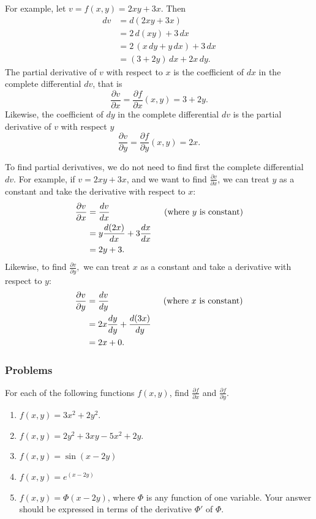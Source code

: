\documentclass[polutonikogreek,english,twoside,openright]{article}
\begin{document}
For example, let $v = f(x,y)= 2xy + 3x.$  Then 
\begin{align*}
dv & = d(2xy + 3x)\\
& = 2\,d(xy) + 3\,dx\\
& = 2\,(x\,dy + y\,dx) + 3\,dx\\
& = (3 + 2y)\,dx + 2x\,dy.
\end{align*}
The partial derivative of $v$ with respect to $x$ is the coefficient
of $dx$ in the complete differential $dv$, that is
$$ \frac{\partial v}{\partial x}= \frac{\partial f}{\partial x} (x,y) = 3+2y.$$
Likewise, the coefficient of $dy$ in the complete differential $dv$ is
the partial derivative of $v$ with respect $y$
$$  \frac{\partial v}{\partial y} = \frac{\partial f}{\partial y} (x,y) = 2x.$$

To find partial derivatives, we do not need to find first the complete
differential $dv$.  For example, if $v= 2xy + 3x$, and we want to find
$\displaystyle \frac{\partial v}{\partial x}$, we can treat $y$ as a
constant and take the derivative with respect to $x$:
\begin{align*}
  \frac{\partial v}{\partial x}  & = \frac{dv}{dx} \text{\hspace{6em} (where $y$ is constant)}\\
                                 & = y \frac{d(2x)}{dx} + 3\frac{dx}{dx}\\
                                 & = 2y + 3.
\end{align*}
Likewise, to find $\displaystyle \frac{\partial v}{\partial y},$ we
can treat $x$ as a constant and take a derivative with respect to $y$:
\begin{align*}
  \frac{\partial v}{\partial y}  & = \frac{dv}{dy} \text{\hspace{6em} (where $x$ is constant)}\\
                                 & =  2x\frac{dy}{dy} + \frac{d(3x)}{dy}\\
                                 & = 2x +0.
\end{align*}

\subsubsection*{Problems}
For each of the following functions $f(x,y)$, find
$\displaystyle \frac{\partial f}{\partial x}$ and
$\displaystyle \frac{\partial f}{\partial y}$.
\begin{enumerate}
\itemsep0em
  \setcounter{enumi}{5}
\item $f(x,y) = 3x^2 + 2y^2.$
\item $f(x,y) = 2y^2 + 3xy - 5x^2 + 2y.$
\item $f(x,y) = \sin(x-2y)$
\item $f(x,y) = e^{(x-2y)}$
\item $f(x,y) = \Phi(x-2y)$, where $\Phi$ is any function of one
  variable.  Your answer should be expressed in terms of the
  derivative $\Phi'$ of $\Phi$.
\end{enumerate}
\end{document}
